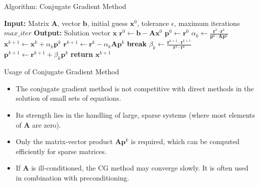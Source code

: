 \documentclass{beamer}
\begin{document}
\begin{frame}[fragile]{Algorithm: Conjugate Gradient Method}
\begin{algorithm}[H]
\caption{Conjugate Gradient Method}
\begin{algorithmic}[1]
\State \textbf{Input:} Matrix $\mathbf{A}$, vector $\mathbf{b}$, initial guess $\mathbf{x}^0$, tolerance $\epsilon$, maximum iterations $max\_iter$
\State \textbf{Output:} Solution vector $\mathbf{x}$
\State $\mathbf{r}^0 \gets \mathbf{b} - \mathbf{A}\mathbf{x}^0$
\State $\mathbf{p}^0 \gets \mathbf{r}^0$
    \State $\alpha_k \gets \frac{\mathbf{r}^k \cdot \mathbf{r}^k}{\mathbf{p}^k \cdot \mathbf{A}\mathbf{p}^k}$
    \State $\mathbf{x}^{k+1} \gets \mathbf{x}^k + \alpha_k \mathbf{p}^k$
    \State $\mathbf{r}^{k+1} \gets \mathbf{r}^k - \alpha_k \mathbf{A}\mathbf{p}^k$
        \State \textbf{break}
    \EndIf
    \State $\beta_k \gets \frac{\mathbf{r}^{k+1} \cdot \mathbf{r}^{k+1}}{\mathbf{r}^k \cdot \mathbf{r}^k}$
    \State $\mathbf{p}^{k+1} \gets \mathbf{r}^{k+1} + \beta_k \mathbf{p}^k$
\EndFor
\State \textbf{return} $\mathbf{x}^{k+1}$
\end{algorithmic}
\end{algorithm}
\end{frame}
\begin{frame}{Usage of Conjugate Gradient Method}
    \begin{itemize}
        \item The conjugate gradient method is not competitive with direct methods in the solution of small sets of equations.
        \item Its strength lies in the handling of large, sparse systems (where most elements of $\mathbf{A}$ are zero).
        \item Only the matrix-vector product $\mathbf{A}\mathbf{p}^k$ is required, which can be computed efficiently for sparse matrices.
        \item If $\mathbf{A}$ is ill-conditioned, the CG method may converge slowly. It is often used in combination with preconditioning.
    \end{itemize}
    
\end{frame}
\end{document}
